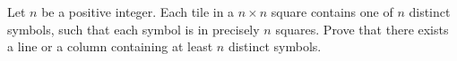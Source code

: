 Let $n$ be a positive integer. Each tile in a $n\times n$ square contains
one of $n$ distinct symbols, such that each symbol is in precisely $n$ squares.
Prove that there exists a line or a column containing at least $n$ distinct symbols.